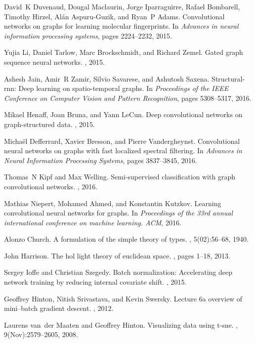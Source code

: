 \documentclass{article}
\begin{document}
\begin{thebibliography}{10}
David~K Duvenaud, Dougal Maclaurin, Jorge Iparraguirre, Rafael Bombarell,
  Timothy Hirzel, Al{\'a}n Aspuru-Guzik, and Ryan~P Adams.
\newblock Convolutional networks on graphs for learning molecular fingerprints.
\newblock In {\em Advances in neural information processing systems}, pages
  2224--2232, 2015.

Yujia Li, Daniel Tarlow, Marc Brockschmidt, and Richard Zemel.
\newblock Gated graph sequence neural networks.
, 2015.

Ashesh Jain, Amir~R Zamir, Silvio Savarese, and Ashutosh Saxena.
\newblock Structural-rnn: Deep learning on spatio-temporal graphs.
\newblock In {\em Proceedings of the IEEE Conference on Computer Vision and
  Pattern Recognition}, pages 5308--5317, 2016.

Mikael Henaff, Joan Bruna, and Yann LeCun.
\newblock Deep convolutional networks on graph-structured data.
, 2015.

Micha{\"e}l Defferrard, Xavier Bresson, and Pierre Vandergheynst.
\newblock Convolutional neural networks on graphs with fast localized spectral
  filtering.
\newblock In {\em Advances in Neural Information Processing Systems}, pages
  3837--3845, 2016.

Thomas~N Kipf and Max Welling.
\newblock Semi-supervised classification with graph convolutional networks.
, 2016.

Mathias Niepert, Mohamed Ahmed, and Konstantin Kutzkov.
\newblock Learning convolutional neural networks for graphs.
\newblock In {\em Proceedings of the 33rd annual international conference on
  machine learning. ACM}, 2016.

Alonzo Church.
\newblock A formulation of the simple theory of types.
, 5(02):56--68, 1940.

John Harrison.
\newblock The hol light theory of euclidean space.
, pages 1--18, 2013.

Sergey Ioffe and Christian Szegedy.
\newblock Batch normalization: Accelerating deep network training by reducing
  internal covariate shift.
, 2015.

Geoffrey Hinton, Nitish Srivastava, and Kevin Swersky.
\newblock Lecture 6a overview of mini--batch gradient descent.
\newblock {\em Coursera Lecture slides https://class. coursera.
  org/neuralnets-2012-001/lecture,[Online}, 2012.

Laurens van~der Maaten and Geoffrey Hinton.
\newblock Visualizing data using t-sne.
, 9(Nov):2579--2605, 2008.

\end{thebibliography}
 
\end{document}
